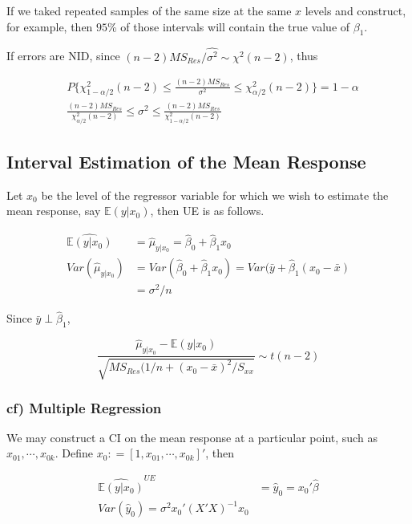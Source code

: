 \documentclass[12pt]{article}
\begin{document}
If we taked repeated samples of the same size at the same $x$ levels and construct, for example, then $95$\% of those intervals will contain the true value of $\beta_1$. 

If errors are NID, since $(n-2) MS_{Res} / \hat{\sigma^2} \sim \chi^2(n-2)$, thus

$$
\begin{aligned}
&P \Bigg\{ \chi^2_{1-\alpha/2} (n-2) \le \frac{(n-2) MS_{Res}}{\sigma^2} \le \chi^2_{\alpha/2} (n-2) \Bigg\} = 1 -\alpha \\[10pt]
&\frac{(n-2) MS_{Res}}{\chi^2_{\alpha/2}(n-2)} \le \sigma^2 \le \frac{(n-2) MS_{Res}}{\chi^2_{1-\alpha/2}(n-2)}
\end{aligned}
$$




\subsection{Interval Estimation of the Mean Response} 

Let $x_0$ be the level of the regressor variable for which we wish to estimate the mean response, say $\mathbb{E} (y|x_0)$, then UE is as follows.

$$
\begin{aligned}
\widehat{\mathbb{E}(y | x_0)} &= \hat{\mu}_{y|x_0} = \hat{\beta}_0 + \hat{\beta}_1 x_0 \\[10pt]
Var(\hat{\mu}_{y|x_0}) &= Var(\hat{\beta}_0 + \hat{\beta}_1 x_0) = Var(\bar{y} + \hat{\beta}_1 (x_0 - \bar{x}) \\[8pt]
&= \sigma^2/n
\end{aligned}
$$

Since $\bar{y} \perp \hat{\beta}_1$,

$$
\frac{\hat{\mu}_{y | x_0} - \mathbb{E}(y | x_0)  } { \sqrt{MS_{Res} (1/n + (x_0 - \bar{x})^2/S_{xx} } } \sim t(n-2)
$$


\subsubsection*{cf) Multiple Regression}

We may construct a CI on the mean response at a particular point, such as $x_{01}, \cdots, x_{0k}$. Define $x_0 : = \left[ 1, x_{01}, \cdots, x_{0k}\right]'$, then 

$$
\begin{aligned}
\widehat{\mathbb{E}(y | x_0)}^{UE} &= \hat{y}_0 = x_0' \hat{\beta} \\[8pt]
Var(\hat{y}_0) = \sigma^2 x_0' (X' X)^{-1} x_0
\end{aligned}
$$
\end{document}
